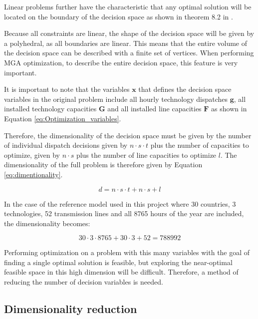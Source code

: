 Linear problems further have the characteristic that any optimal solution will be located on the boundary of the decision space as shown in theorem 8.2 in \cite{OpimizationIntroduction}. 

Because all constraints are linear, the shape of the decision space will be given by a polyhedral, as all boundaries are linear. This means that the entire volume of the decision space can be described with a finite set of vertices. When performing MGA optimization, to describe the entire decision space, this feature is very important. 

It is important to note that the variables $\mathbf{x}$ that defines the decision space variables in the original problem include all hourly technology dispatches $\mathbf{g}$, all installed technology capacities $\mathbf{G}$ and all installed line capacities $\mathbf{F}$ as shown in Equation \ref{eq:Optimization_variables}. 

Therefore, the dimensionality of the decision space must be given by the number of individual dispatch decisions given by $n\cdot s \cdot t$ plus the number of capacities to optimize, given by $n\cdot s$ plus the number of line capacities to optimize $l$. The dimensionality of the full problem is therefore given by Equation \ref{eq:dimentionality}.

\begin{equation}\label{eq:dimentionality}
d = n\cdot s \cdot t + n\cdot s + l
\end{equation}

In the case of the reference model used in this project where 30 countries, 3 technologies, 52 transmission lines and all 8765 hours of the year are included, the dimensionality becomes: 

\begin{equation*}
30 \cdot 3 \cdot 8765 + 30 \cdot 3 + 52 = 788992
\end{equation*}

Performing optimization on a problem with this many variables with the goal of finding a single optimal solution is feasible, but exploring the near-optimal feasible space in this high dimension will be difficult. Therefore, a method of reducing the number of decision variables is needed. 


\subsection{Dimensionality reduction}\label{sec:dim_reduction}

